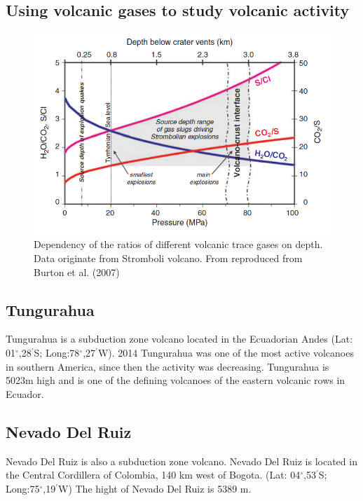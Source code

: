 \documentclass  [
  paper    = a4,
  BCOR     = 10mm,
  twoside,
  fontsize = 12pt,
  fleqn,
  toc      = bibnumbered,
  toc      = listofnumbered,
  numbers  = noendperiod,
  headings = normal,
  listof   = leveldown,
  version  = 3.03
]                                       {scrreprt}
\begin{document}
	
	
	
	
	
	
	
	
	
	
	


	\subsection{Using volcanic gases to study volcanic activity}
	\begin{figure}
		\centering
		\includegraphics[width=0.7\linewidth]{Zwischenbericht2018/Bilder/so2_bro}
		\caption{Dependency of the ratios of different volcanic trace gases on depth. Data originate from Stromboli volcano. From \cite{lubcke2014optical} reproduced from Burton et al. (2007)}
		\label{fig:so2bro}
	\end{figure}	




	\subsection*{Tungurahua}
	Tungurahua is a subduction zone volcano located in the Ecuadorian Andes (Lat: 01$^{\circ}$,28$^{'}$S; Long:78$^{\circ}$,27$^{'}$W). 2014 Tungurahua was one of the most active volcanoes in southern America, since then the activity was decreasing. Tungurahua is 5023m high and is one of the defining volcanoes of the eastern volcanic rows in Ecuador. \cite{hall1999tungurahua}
		
	\subsection*{Nevado Del Ruiz}
	Nevado Del Ruiz is also a subduction zone volcano. 	Nevado Del Ruiz  is located in the Central Cordillera of Colombia, 140 km west of Bogota.
	(Lat: 04$^{\circ}$,53$^{'}$S; Long:75$^{\circ}$,19$^{'}$W) 
	The hight of Nevado Del Ruiz is 5389 m.
	 
\end{document}
